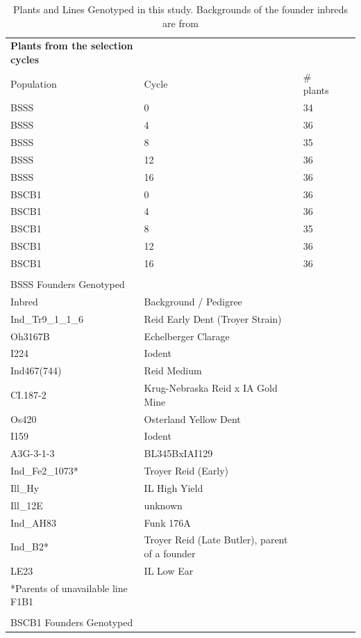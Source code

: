 \begin{table}
\caption{Plants and Lines Genotyped in this study.
Backgrounds of the founder inbreds are from \citet{hagdorn2003molecular}}
\begin{tabular}{ | l | l | l | l | }

	{\bf Plants from the selection cycles} &  &  &  \\ 
	Population  & Cycle & \# plants &   \\ 
	BSSS & 0 & 34 &  \\ 
	BSSS & 4 & 36 &  \\ 
	BSSS & 8 & 35 &  \\ 
	BSSS & 12 & 36 &  \\ 
	BSSS & 16 & 36 &  \\ 
	BSCB1 & 0 & 36 &  \\ 
	BSCB1 & 4 & 36 &  \\ 
	BSCB1 & 8 & 35 &  \\ 
	BSCB1 & 12 & 36 &  \\ 
	BSCB1 & 16 & 36 &  \\ 
	 &  &  &  \\ 
	BSSS Founders Genotyped &  &  &  \\ 
	Inbred & Background / Pedigree &  &  \\ 
	Ind\_Tr9\_1\_1\_6 & Reid Early Dent (Troyer Strain) &  &  \\ 
	Oh3167B & Echelberger Clarage &  &  \\ 
	I224 & Iodent &  &  \\ 
	Ind467(744) & Reid Medium &  &  \\ 
	CI.187-2 & Krug-Nebraska Reid x IA Gold Mine &  &  \\ 
	Os420 & Osterland Yellow Dent &  &  \\ 
	I159 & Iodent &  &  \\ 
	A3G-3-1-3 & BL345BxIAI129 &  &  \\ 
	Ind\_Fe2\_1073* & Troyer Reid (Early) &  &  \\ 
	Ill\_Hy & IL High Yield &  &  \\ 
	Ill\_12E & unknown &  &  \\ 
	Ind\_AH83 & Funk 176A &  &  \\ 
	Ind\_B2* & Troyer Reid (Late Butler), parent of a founder &  &  \\ 
	LE23 & IL Low Ear &  &  \\ 
	*Parents of unavailable line F1B1 &  &  &  \\ 
	 &  &  &  \\ 
	BSCB1 Founders Genotyped &  &  &  \\ 

\end{tabular}
\end{table}
